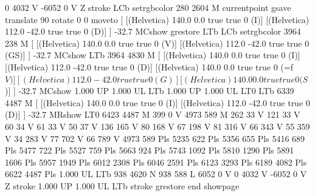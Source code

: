0 4032 V
-6052 0 V
Z stroke
LCb setrgbcolor
280 2604 M
currentpoint gsave translate 90 rotate 0 0 moveto
[ [(Helvetica) 140.0 0.0 true true 0 (I)]
[(Helvetica) 112.0 -42.0 true true 0 (D)]
] -32.7 MCshow
grestore
LTb
LCb setrgbcolor
3964 238 M
[ [(Helvetica) 140.0 0.0 true true 0 (V)]
[(Helvetica) 112.0 -42.0 true true 0 (GS)]
] -32.7 MCshow
LTb
3964 4830 M
[ [(Helvetica) 140.0 0.0 true true 0 (I)]
[(Helvetica) 112.0 -42.0 true true 0 (D)]
[(Helvetica) 140.0 0.0 true true 0 (=f\(V)]
[(Helvetica) 112.0 -42.0 true true 0 (G)]
[(Helvetica) 140.0 0.0 true true 0 (S\))]
] -32.7 MCshow
1.000 UP
1.000 UL
LTb
1.000 UP
1.000 UL
LT0
LTb
6339 4487 M
[ [(Helvetica) 140.0 0.0 true true 0 (I)]
[(Helvetica) 112.0 -42.0 true true 0 (D)]
] -32.7 MRshow
LT0
6423 4487 M
399 0 V
4973 589 M
262 33 V
121 33 V
60 34 V
61 33 V
50 37 V
136 165 V
80 168 V
67 198 V
81 316 V
66 343 V
55 359 V
34 283 V
77 702 V
66 789 V
4973 589 Pls
5235 622 Pls
5356 655 Pls
5416 689 Pls
5477 722 Pls
5527 759 Pls
5663 924 Pls
5743 1092 Pls
5810 1290 Pls
5891 1606 Pls
5957 1949 Pls
6012 2308 Pls
6046 2591 Pls
6123 3293 Pls
6189 4082 Pls
6622 4487 Pls
1.000 UL
LTb
938 4620 N
938 588 L
6052 0 V
0 4032 V
-6052 0 V
Z stroke
1.000 UP
1.000 UL
LTb
stroke
grestore
end
showpage
